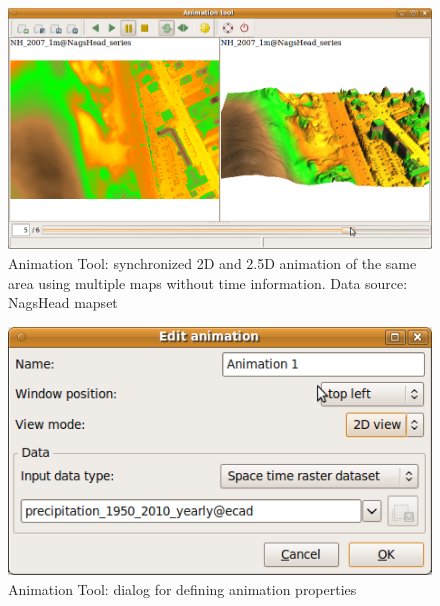 \documentclass[a4paper,12pt,oneside]{book}
\newcommand{\at}{Animation Tool\xspace}
\begin{document}
\begin{figure}[h!]
  \centering
  \includegraphics{./images/animation_tool2.png}
  \caption[\at: synchronized 2D and 2.5D animation of the same area using
  multiple maps without time information]
  {\at: synchronized 2D and 2.5D animation of the same area using
  multiple maps without time information. Data source: NagsHead mapset~\cite{nagshead}}
  \label{fig:anim3D}
\end{figure}

\begin{figure}[h!]
  \centering
  \includegraphics{./images/animation_tool_edit.png}
  \caption{\at: dialog for defining animation properties}
  \label{fig:anim_edit}
\end{figure}
\end{document}
